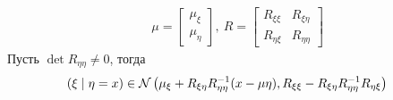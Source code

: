 \begin{enumerate}
\begin{align*}
      & \mu = \left[ \begin{matrix}
              \mu_{\xi} \\
              \mu_{\eta}
          \end{matrix} \right], \ R = \left[ \begin{matrix}
              R_{\xi \xi} & R_{\xi \eta} \\
              R_{\eta \xi} & R_{\eta \eta}
          \end{matrix} \right]
    \end{align*}
    Пусть $\det R_{\eta \eta} \neq 0$, тогда
    \begin{align*}
      & \left( \xi \mid \eta = x \right) \in \mathcal{N}\left( \mu_{\xi} + R_{\xi \eta}R^{-1}_{\eta \eta}(x-\mu\eta), R_{\xi \xi}-R_{\xi \eta}R_{\eta \eta}^{-1}R_{\eta \xi}\right)
    \end{align*}    
\end{enumerate}
